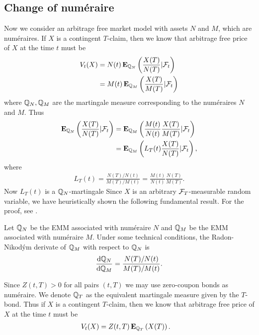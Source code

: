 \subsection{Change of num\'{e}raire}

Now we consider an arbitrage free market model with assets $N$ and $M$, which are num\'{e}raires. If $X$ is a contingent $T$-claim, then we know that arbitrage free price of $X$ at the time $t$ must be
  \begin{align}
    V_t (X) &= N(t) \operatorname{\boldsymbol{\mathrm{E}}}_{\mathbb{Q}_N} \left( \frac{X(T)}{N(T)} | \mathcal{F}_t \right) \\
            &= M(t) \operatorname{\boldsymbol{\mathrm{E}}}_{\mathbb{Q}_M} \left( \frac{X(T)}{M(T)} | \mathcal{F}_t \right)
  \end{align}
where $\mathbb{Q}_N, \mathbb{Q}_M$ are the martingale measure corresponding to the num\'{e}raires $N$ and $M$. Thus
  \begin{align}
    \operatorname{\boldsymbol{\mathrm{E}}}_{\mathbb{Q}_N} \left( \frac{X(T)}{N(T)} | \mathcal{F}_t \right) &= \operatorname{\boldsymbol{\mathrm{E}}}_{\mathbb{Q}_M} \left( \frac{M(t)}{N(t)} \frac{X(T)}{M(T)} | \mathcal{F}_t \right) \\
      &= \operatorname{\boldsymbol{\mathrm{E}}}_{\mathbb{Q}_M} \left( L_T(t) \frac{X(T)}{N(T)} | \mathcal{F}_t \right),
  \end{align}
where
  \begin{align}
    L_T(t) = \frac{N(T) / N(t)}{ M(T) / M(t) } = \frac{M(t)}{N(t)} \frac{N(T)}{M(T)} .
  \end{align}
Now $L_T(t)$ is a $\mathbb{Q}_N$-martingale 
Since $X$ is an arbitrary $\mathcal{F}_T$-measurable random variable, we have heuristically shown the following fundamental result. For the proof, see \cite{gemanelkarouirochet1995changes}.
  
\begin{thm}
Let $\mathbb{Q}_N$ be the EMM associated with num\'{e}raire $N$ and $\mathbb{Q}_M$ be the EMM associated with num\'{e}raire $M$. Under some technical conditions, the Radon-Nikod\'{y}m derivate of $\mathbb{Q}_M$ with respect to $\mathbb{Q}_N$ is
  \begin{align}
    \frac{\mathrm{d} \mathbb{Q}_N}{\mathrm{d} \mathbb{Q}_M} = \frac{N(T) / N(t)}{ M(T) / M(t) } .
  \end{align}
\end{thm}

Since $Z(t,T) > 0$ for all pairs $(t,T)$ we may use zero-coupon bonds as num\'{e}raire. We denote $\mathbb{Q}_T$ as the equivalent martingale measure given by the $T$-bond. Thus if $X$ is a contingent $T$-claim, then we know that arbitrage free price of $X$ at the time $t$ must be
  \begin{align}
    V_t (X) &= Z(t,T) \operatorname{\boldsymbol{\mathrm{E}}}_{\mathbb{Q}_T} \left( X(T) \right) .
  \end{align}

